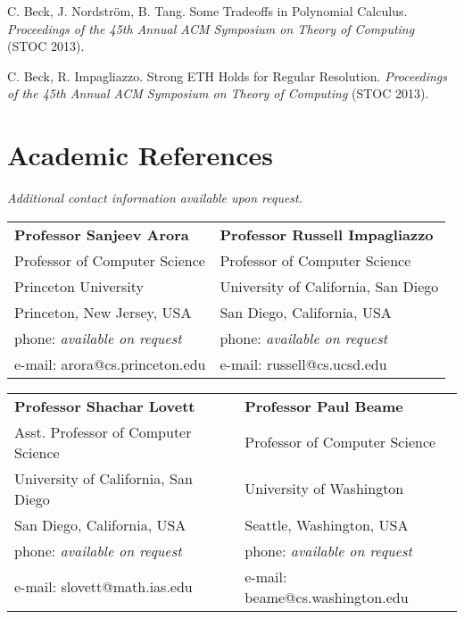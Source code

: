 \documentclass[margin,line]{resume}
\begin{document}
\begin{resume}
\vspace{-2mm}
    C. Beck, J. Nordstr{\"o}m, B. Tang. Some Tradeoffs in Polynomial Calculus. 
    \textsl{Proceedings of the 45th Annual ACM Symposium on Theory of Computing } (STOC 2013).
    

\vspace{-2mm}
    C. Beck, R. Impagliazzo. Strong ETH Holds for Regular Resolution.
    \textsl{Proceedings of the 45th Annual ACM Symposium on Theory of Computing } (STOC 2013).





\newpage
\section{\mysidestyle Academic References} 
\emph{Additional contact information available upon request.}

\begin{tabular}{@{}p{6cm}p{6cm}}
\textbf{Professor Sanjeev Arora}        &  \textbf{Professor Russell Impagliazzo}   \\
Professor of Computer Science           &  Professor of Computer Science            \\
Princeton University                    &  University of California, San Diego      \\
Princeton, New Jersey, USA              &  San Diego, California, USA               \\
phone: \textsl{available on request}    &  phone: \textsl{available on request}     \\
e-mail: arora@cs.princeton.edu        &  e-mail: russell@cs.ucsd.edu    \\
\end{tabular}

\begin{tabular}{@{}p{6cm}p{6cm}}
\textbf{Professor Shachar Lovett}    &  \textbf{Professor Paul Beame}        \\
Asst. Professor of Computer Science   &  Professor of Computer Science                 \\
University of California, San Diego       &  University of Washington       \\
San Diego, California, USA                           &  Seattle, Washington, USA                \\
phone: \textsl{available on request}    &  phone: \textsl{available on request}     \\
e-mail: slovett@math.ias.edu           &  e-mail: beame@cs.washington.edu    \\
\end{tabular}



\end{resume}
\end{document}
